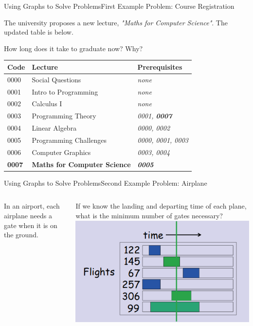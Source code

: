 \begin{frame}{Using Graphs to Solve Problems}{First Example Problem: Course Registration}

  The university proposes a new lecture, \emph{"Maths for Computer Science"}. The updated table is below. \medskip

  How long does it take to graduate now? Why?

  \begin{tabular}{p{}|p{}||p{}}
    \hline
    Code & Lecture & Prerequisites \\
    \hline
    0000 & {\small Social Questions} & \emph{none} \\
    0001 & {\small Intro to Programming} & \emph{none} \\
    0002 & {\small Calculus I} & \emph{none} \\
    0003 & {\small Programming Theory} & \emph{0001, {\bf 0007}} \\
    0004 & {\small Linear Algebra} & \emph{0000, 0002} \\
    0005 & {\small Programming Challenges} & \emph{0000, 0001, 0003} \\
    0006 & {\small Computer Graphics} & \emph{0003, 0004} \\
    {\bf 0007} & {\small {\bf Maths for Computer Science}} & {\bf\emph{0005}} \\
    \hline
  \end{tabular}
\end{frame}

\begin{frame}{Using Graphs to Solve Problems}{Second Example Problem: Airplane}
  \begin{columns}

    In an airport, each airplane needs a gate when it is on the ground.\medskip

    If we know the landing and departing time of each plane, what is the minimum number of gates necessary?
    \includegraphics[width=\textwidth]{../img/gatetable}
  \end{columns}
\end{frame}

